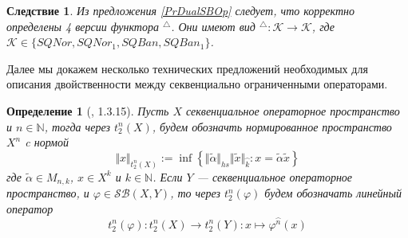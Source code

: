 \documentclass[12pt]{article}
\newtheorem{corollary}[theorem]{Следствие}
\newtheorem{definition}[theorem]{Определение}
\begin{document}
\begin{corollary}\label{CorDualFunc}
Из предложения \ref{PrDualSBOp} следует, что корректно определены 4 версии функтора ${}^\triangle$. Они имеют вид ${}^\triangle:\mathcal{K}\to\mathcal{K}$, где $\mathcal{K}\in\{SQNor,SQNor_1,SQBan,SQBan_1\}$. 
\end{corollary}

Далее мы докажем несколько технических предложений необходимых для описания двойственности между секвенциально ограниченными операторами.

\begin{definition}[\cite{LamOpFolgen}, 1.3.15]\label{DefT2n}
Пусть $X$ секвенциальное операторное пространство и $n\in\mathbb{N}$, тогда через $t_2^n(X)$, будем обозначть нормированное пространство $X^n$ c нормой
$$
\Vert x\Vert_{t_2^n(X)}:=\inf\left\{\Vert\tilde{\alpha}\Vert_{hs}\Vert \tilde{x}\Vert_{\wideparen{k}}:x=\tilde{\alpha} \tilde{x}\right\}
$$
где $\tilde{\alpha}\in M_{n,k}$, $x\in X^k$ и $k\in\mathbb{N}$. Если $Y$ --- секвенциальное операторное пространство, и $\varphi\in\mathcal{SB}(X,Y)$, то через $t_2^n(\varphi)$ будем обозначать линейный оператор
$$
t_2^n(\varphi): t_2^n(X)\to t_2^n(Y): x\mapsto \varphi^{\wideparen{n}}(x)
$$
\end{definition}
\end{document}
